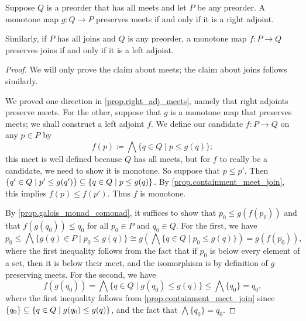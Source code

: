 \documentclass[7Sketches]{subfiles}
\begin{document}
\begin{theorem}%
\label{prop.adjoint_functor_thm}%
Suppose $Q$ is a preorder that has all meets and let $P$ be any preorder. A monotone map $g\colon Q \to P$
preserves meets if and only if it is a right adjoint. 

Similarly, if $P$ has all joins and $Q$ is any preorder, a monotone map $f\colon P \to Q$ preserves joins if
and only if it is a left adjoint.
\end{theorem}
\begin{proof}
We will only prove the claim about meets; the claim about joins follows similarly.

We proved one direction in \cref{prop.right_adj_meets}, namely that right adjoints preserve meets. For the other, suppose that $g$ is a
monotone map that preserves meets; we shall construct a left adjoint $f$. We define our candidate $f\colon P \to Q$ on any $p\in P$ by
\begin{equation}%
\label{eqn.def_f_random596}
  f(p)\coloneqq\bigwedge \{q \in Q \mid p\leq g(q)\};
\end{equation}
this meet is well defined because $Q$ has all meets, but for $f$ to really be a candidate, we need to show it is monotone. So suppose that $p\leq p'$. Then $\{q' \in Q \mid p'\leq g(q')\}\ss\{q \in Q \mid p\leq g(q)\}$. By \cref{prop.containment_meet_join}, this implies $f(p)\leq f(p')$. Thus $f$ is monotone.

By \cref{prop.galois_monad_comonad}, it suffices to show that $p_0\leq g(f(p_0))$ and that $f(g(q_0))\leq q_0$ for all $p_0\in P$ and $q_0\in Q$. For the first, we have
\[
  p_0\leq
  \bigwedge\{g(q)\in P\mid p_0\leq g(q)\}\cong
  g\left(\bigwedge\{q\in Q\mid p_0\leq g(q)\}\right)=
  g(f(p_0)),
\]
where the first inequality follows from the fact that if $p_0$ is below every element of a set, then it is below their meet, and the isomorphism is by definition of $g$ preserving meets. For the second, we have
\[
	f(g(q_0))=\bigwedge\{q\in Q\mid g(q_0)\leq g(q)\}\leq\bigwedge\{q_0\}=q_0,
\]
where the first inequality follows from \cref{prop.containment_meet_join} since $\{q_0\}\ss\{q\in Q\mid g(q_0)\leq g(q)\}$, and the fact that $\bigwedge\{q_0\}=q_0$.
\end{proof}
\end{document}
